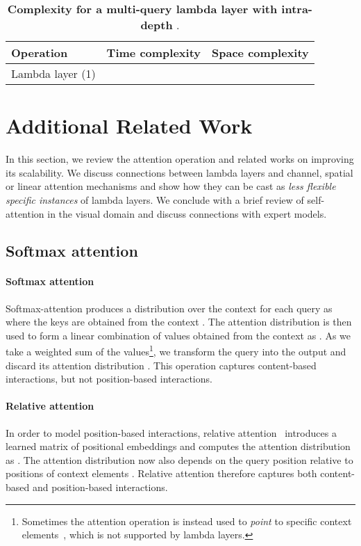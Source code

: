 \documentclass{article} \usepackage{iclr2021_conference,times}
\begin{document}
\begin{table}[h]
  \begin{center}
  \small
  \begin{tabular}{l|cc}
    \toprule
    Operation & Time complexity & Space complexity \\
    \midrule
    Lambda layer (1) &  &  \\
    \bottomrule
  \end{tabular}
  \caption{\textbf{Complexity for a multi-query lambda layer with intra-depth }.}
  \label{tab:complexity_u}
  \end{center}
\end{table}
 \newpage
\section{Additional Related Work\label{sec:additional_related_work}}
In this section, we review the attention operation and related works on improving its scalability.
We discuss connections between lambda layers and channel, spatial or linear attention mechanisms and show how they can be cast as \emph{less flexible specific instances} of lambda layers.
We conclude with a brief review of self-attention in the visual domain and discuss connections with expert models.

\vspace{-0.1cm}
\subsection{Softmax attention}
\paragraph{Softmax attention}
Softmax-attention produces a distribution over the context for each query  as  where the keys  are obtained from the context .
The attention distribution  is then used to form a linear combination of values  obtained from the context as .
As we take a weighted sum of the values\footnote{
Sometimes the attention operation is instead used to \emph{point} to specific context elements~\citep{vinyals2015pointer,bello2016nco}, which is not supported by lambda layers.}, we transform the query  into the output  and discard its attention distribution .
This operation captures content-based interactions, but not position-based interactions.

\vspace{-0.1cm}
\paragraph{Relative attention}
In order to model position-based interactions, relative attention~\citep{shaw2018relative} introduces a learned matrix of  positional embeddings  and computes the attention distribution as .
The attention distribution now also depends on the query position  relative to positions of context elements .
Relative attention therefore captures both content-based and position-based interactions.
\end{document}
